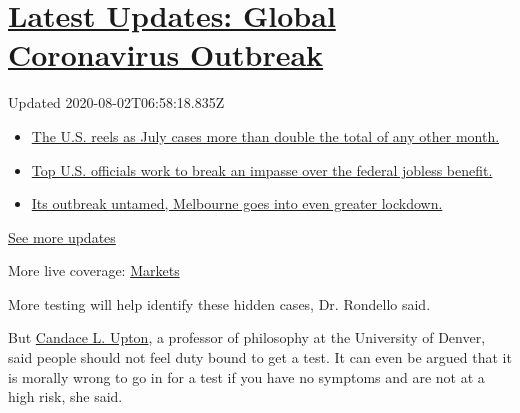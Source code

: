 \hypertarget{latest-updates-global-coronavirus-outbreak}{%
\section{\texorpdfstring{\href{https://www.nytimes.com/2020/08/01/world/coronavirus-covid-19.html?action=click\&pgtype=Article\&state=default\&region=MAIN_CONTENT_1\&context=storylines_live_updates}{Latest
Updates: Global Coronavirus
Outbreak}}{Latest Updates: Global Coronavirus Outbreak}}\label{latest-updates-global-coronavirus-outbreak}}

Updated 2020-08-02T06:58:18.835Z

\begin{itemize}
\tightlist
\item
  \href{https://www.nytimes.com/2020/08/01/world/coronavirus-covid-19.html?action=click\&pgtype=Article\&state=default\&region=MAIN_CONTENT_1\&context=storylines_live_updates\#link-34047410}{The
  U.S. reels as July cases more than double the total of any other
  month.}
\item
  \href{https://www.nytimes.com/2020/08/01/world/coronavirus-covid-19.html?action=click\&pgtype=Article\&state=default\&region=MAIN_CONTENT_1\&context=storylines_live_updates\#link-780ec966}{Top
  U.S. officials work to break an impasse over the federal jobless
  benefit.}
\item
  \href{https://www.nytimes.com/2020/08/01/world/coronavirus-covid-19.html?action=click\&pgtype=Article\&state=default\&region=MAIN_CONTENT_1\&context=storylines_live_updates\#link-2bc8948}{Its
  outbreak untamed, Melbourne goes into even greater lockdown.}
\end{itemize}

\href{https://www.nytimes.com/2020/08/01/world/coronavirus-covid-19.html?action=click\&pgtype=Article\&state=default\&region=MAIN_CONTENT_1\&context=storylines_live_updates}{See
more updates}

More live coverage:
\href{https://www.nytimes.com/live/2020/07/31/business/stock-market-today-coronavirus?action=click\&pgtype=Article\&state=default\&region=MAIN_CONTENT_1\&context=storylines_live_updates}{Markets}

More testing will help identify these hidden cases, Dr. Rondello said.

But
\href{https://www.du.edu/ahss/philosophy/faculty_staff/upton_candace.html}{Candace
L. Upton}, a professor of philosophy at the University of Denver, said
people should not feel duty bound to get a test. It can even be argued
that it is morally wrong to go in for a test if you have no symptoms and
are not at a high risk, she said.

